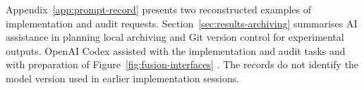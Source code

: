Appendix~\ref{app:prompt-record} presents two reconstructed examples of implementation
and audit requests. Section~\ref{sec:results-archiving} summarises AI assistance in
planning local archiving and Git version control for experimental outputs. OpenAI Codex
assisted with the implementation and audit tasks and with preparation of
Figure~\ref{fig:fusion-interfaces} \citep{OpenAICodex}. The records do not identify the
model version used in earlier implementation sessions.

